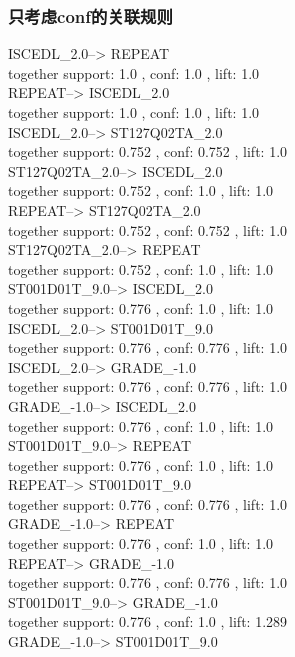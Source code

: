 \documentclass[12pt, a4paper, oneside]{ctexart}
\begin{document}
\subsubsection{只考虑conf的关联规则 }   
ISCEDL\_2.0--> REPEAT\\
together support: 1.0 , conf: 1.0 , lift: 1.0\\
REPEAT--> ISCEDL\_2.0\\
together support: 1.0 , conf: 1.0 , lift: 1.0\\
ISCEDL\_2.0--> ST127Q02TA\_2.0\\
together support: 0.752 , conf: 0.752 , lift: 1.0\\
ST127Q02TA\_2.0--> ISCEDL\_2.0\\
 together support: 0.752 , conf: 1.0 , lift: 1.0\\
REPEAT--> ST127Q02TA\_2.0\\
together support: 0.752 , conf: 0.752 , lift: 1.0\\
ST127Q02TA\_2.0--> REPEAT\\
 together support: 0.752 , conf: 1.0 , lift: 1.0\\
ST001D01T\_9.0--> ISCEDL\_2.0\\
 together support: 0.776 , conf: 1.0 , lift: 1.0\\
ISCEDL\_2.0--> ST001D01T\_9.0\\
 together support: 0.776 , conf: 0.776 , lift: 1.0\\
ISCEDL\_2.0--> GRADE\_-1.0\\
 together support: 0.776 , conf: 0.776 , lift: 1.0\\
GRADE\_-1.0--> ISCEDL\_2.0\\
 together support: 0.776 , conf: 1.0 , lift: 1.0\\
ST001D01T\_9.0--> REPEAT\\
 together support: 0.776 , conf: 1.0 , lift: 1.0\\
REPEAT--> ST001D01T\_9.0\\
 together support: 0.776 , conf: 0.776 , lift: 1.0\\
GRADE\_-1.0--> REPEAT\\
 together support: 0.776 , conf: 1.0 , lift: 1.0\\
REPEAT--> GRADE\_-1.0\\
 together support: 0.776 , conf: 0.776 , lift: 1.0\\
ST001D01T\_9.0--> GRADE\_-1.0\\
 together support: 0.776 , conf: 1.0 , lift: 1.289\\
GRADE\_-1.0--> ST001D01T\_9.0\\
\end{document}
